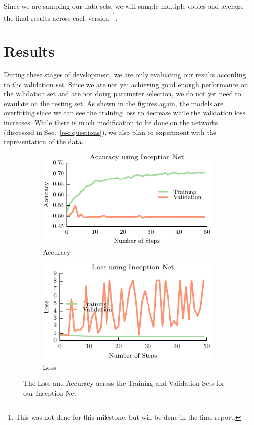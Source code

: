 \documentclass[letterpaper, 10 pt, conference]{../ieeeconf}
\newcommand{\sref}[1]{Sec.~\ref{#1}} %
\begin{document}
Since we are sampling our data sets, we will sample multiple copies and average the final results across each version~\footnote{This was not done for this milestone, but will be done in the final report.}.

\section{Results}
\label{sec:results}
During these stages of development, we are only evaluating our results according to the validation set. 
Since we are not yet achieving good enough performance on the validation set and are not doing parameter selection, we do not yet need to evaulate on the testing set. 
As shown in the figures again, the models are overfitting since we can see the training loss to decrease while the validation loss increases. 
While there is much modification to be done on the networks (discussed in \sref{sec:questions}), we also plan to experiment with the representation of the data.

\begin{figure}[t!]
    \begin{subfigure}[t]{0.49\textwidth}
        \includegraphics[width=0.75\columnwidth]{figs/inception_accuracy.pdf}
        \caption{Accuracy} \label{fig:accuracy}
        \end{subfigure}
    \begin{subfigure}[t]{0.49\textwidth}
        \includegraphics[width=0.75\columnwidth]{figs/inception_loss.pdf}
        \caption{Loss} \label{fig:loss}
    \end{subfigure}
\caption{The Loss and Accuracy across the Training and Validation Sets for our Inception Net} \label{fig:inception_results}
\end{figure}
\end{document}
